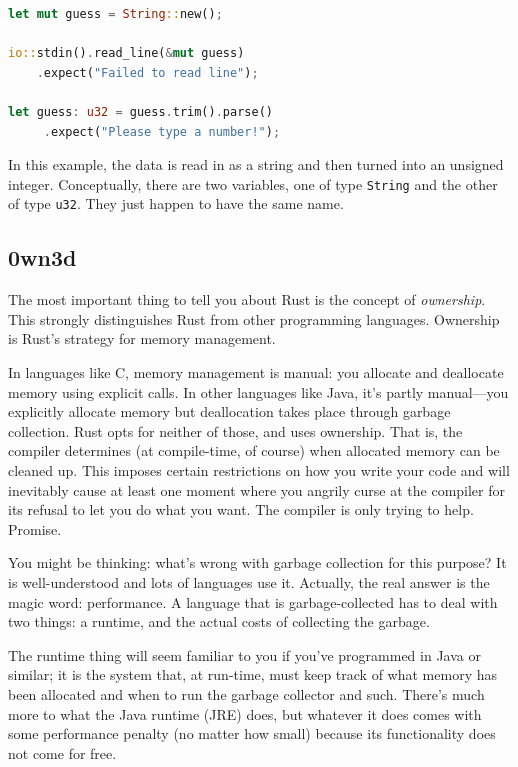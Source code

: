 \begin{lstlisting}[language=Rust]
let mut guess = String::new();

io::stdin().read_line(&mut guess)
    .expect("Failed to read line");

let guess: u32 = guess.trim().parse()
     .expect("Please type a number!");
\end{lstlisting}

In this example, the data is read in as a string and then turned into an unsigned integer. Conceptually, there are two variables, one of type \texttt{String} and the other of type \texttt{u32}. They just happen to have the same name.

\subsection*{0wn3d} The most important thing to tell you about Rust is the concept of \textit{ownership}. This strongly distinguishes Rust from other programming languages. Ownership is Rust's strategy for memory management. 

In languages like C, memory management is manual: you allocate and deallocate memory using explicit calls. In other languages like Java, it's partly manual---you explicitly allocate memory but deallocation takes place through garbage collection. Rust opts for neither of those, and uses ownership. That is, the compiler determines (at compile-time, of course) when allocated memory can be cleaned up. This imposes certain restrictions on how you write your code and will inevitably cause at least one moment where you angrily curse at the compiler for its refusal to let you do what you want. The compiler is only trying to help. Promise.

You might be thinking: what's wrong with garbage collection for this purpose? It is well-understood and lots of languages use it. Actually, the real answer is the magic word: performance. A language that is garbage-collected has to deal with two things: a runtime, and the actual costs of collecting the garbage.

The runtime thing will seem familiar to you if you've programmed in Java or similar; it is the system that, at run-time, must keep track of what memory has been allocated and when to run the garbage collector and such. There's much more to what the Java runtime (JRE) does, but whatever it does comes with some performance penalty (no matter how small) because its functionality does not come for free. 

